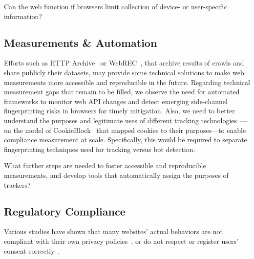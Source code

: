 \begin{opbox}
Can the web function if browsers limit collection of device- or user-specific information?
\end{opbox}
\vspace{-4mm}


\subsection{Measurements \& Automation}
\vspace{-2mm}

Efforts such as HTTP Archive~\cite{httparchiveHTTPArchive} or WebREC~\cite{hantkeWebExecutionBundles2025}, that archive results of crawls and share publicly their datasets, may provide some technical solutions to make web measurements more accessible and reproducible in the future.
%
Regarding technical measurement gaps that remain to be filled, we observe the need for automated frameworks to monitor web API changes and detect emerging side-channel fingerprinting risks in browsers for timely mitigation. Also, we need to better understand the purposes and legitimate uses of different tracking technologies~\cite{tothContributionPublicConsultation2020}---on the model of CookieBlock~\cite{bollingerAutomatingCookieConsent2022} that mapped cookies to their purposes---to enable compliance measurement at scale. Specifically, this would be required to separate fingerprinting techniques used for tracking versus bot detection. 

\begin{opbox}
What further steps are needed to foster accessible and reproducible measurements, and develop tools that automatically assign the purposes of trackers?
\end{opbox}
\vspace{-4mm}

\subsection{Regulatory Compliance}
\label{sec:compliance}
\vspace{-2mm}

Various studies have shown that many websites' actual behaviors are not compliant with their own privacy policies~\cite{libertAutomatedApproachAuditing2018,ouViopolicyDetectorAutomatedApproach2022}, or do not respect or register users’ %
consent correctly~\cite{carpinetoAutomaticAssessmentWebsite2016,sanchezrolaCanIOptOutYet2019,matteCookieBannersRespect2020,mehrnezhadCrossPlatformEvaluationPrivacy2020,bouhoulaAutomatedLargeScaleAnalysis2024,vannortwickSettingBarLow2022,birrellSoKTechnicalImplementation2024,Kanc-etal-25-PETs}.

